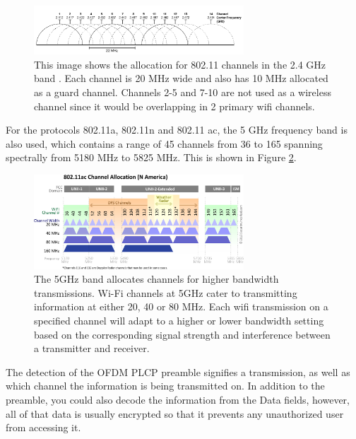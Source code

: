 \begin{figure}[ht]
\centering
\includegraphics[width=0.70\textwidth]{img/2_GHz_Channels.png}
\caption{This image shows the allocation for 802.11 channels in the 2.4 GHz band \cite{5ghzphoto}. Each channel is 20 MHz wide and also has 10 MHz allocated as a guard channel. Channels 2-5 and 7-10 are not used as a wireless channel since it would be overlapping in 2 primary wifi channels.}
\label{fig:2.4GHz_channel}
\end{figure} \par
For the protocols 802.11a, 802.11n and 802.11 ac, the 5 GHz frequency band is also used, which contains a range of 45 channels from 36 to 165 spanning spectrally from 5180 MHz to 5825 MHz.  This is shown in Figure \ref{fig:5GHz_channel}.
\begin{figure}[ht]
\centering
\includegraphics[width=0.70\textwidth]{img/5_GHz_Channels.png}
\caption{The 5GHz band allocates channels for higher bandwidth transmissions.  Wi-Fi channels at 5GHz cater to transmitting information at either 20, 40 or 80 MHz. Each wifi transmission on a specified channel will adapt to a higher or lower bandwidth setting based on the corresponding signal strength and interference between a transmitter and receiver.\cite{5ghzphoto}}
\label{fig:5GHz_channel}
\end{figure}
The detection of the OFDM PLCP preamble signifies a transmission, as well as which channel the information is being transmitted on. In addition to the preamble, you could also decode the information from the Data fields, however, all of that data is usually encrypted so that it prevents any unauthorized user from accessing it. \cite{wifi_book}

